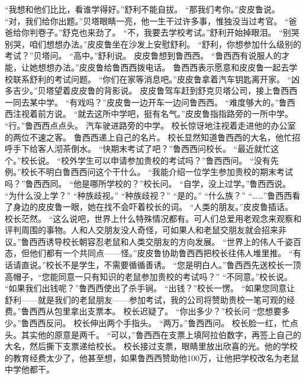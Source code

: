 \documentclass[a4paper,12pt,UTF8,twoside]{ctexbook}
\begin{document}
        “我想和他们比比，看谁学得好。”舒利不能自拔。 
        “那我们考你。”皮皮鲁说。 
        “对，我们给你出题。”贝塔眼睛一亮，他一生干过许多事，惟独没当过考官。 
        “爸爸给你判卷子。”舒克也来劲了。 
        “不，我要去学校考试。”舒利开始掉眼泪。 
        “别哭别哭，咱们想想办法。”皮皮鲁坐在沙发上安慰舒利。 
        “舒利，你想参加什么级别的考试？”贝塔问。 
        “高中。”舒利说。 
        皮皮鲁想到鲁西西。 
        “鲁西西有说服人的才能，让她想想办法。”皮皮鲁给鲁西西拨电话。 
        鲁西西表示愿意和皮皮鲁一起去学校联系舒利的考试问题。 
        “你们在家等消息吧。”皮皮鲁拿着汽车钥匙离开家。 
        “凶多吉少。”贝塔望着皮皮鲁的背影说。 
        皮皮鲁驾车赶到舒克贝塔公司，接上鲁西西一同去某中学。 
        “有戏吗？”皮皮鲁一边开车一边问鲁西西。 
        “难度够大的。”鲁西西注视着前方说。 
        “就去这所中学吧，挺有名气。”皮皮鲁指指路旁的一所中学。 
        “行。”鲁西西点点头。 
        汽车驶进路旁的中学。 
        校长惊讶地注视着走进他的办公室的两位不速之客。 
        鲁西西递上自己的名片。 
        校长显然知道鲁西西的大名，他忙招呼手下给客人沏茶倒水。 
        “快期末考试了吧？”鲁西西问校长。 
        “最近就忙这个。”校长说。 
        “校外学生可以申请参加贵校的考试吗？”鲁西西问。 
        “没有先例。”校长不明白鲁西西问这个干什么。 
        “我能介绍一位学生参加贵校的期末考试吗？”鲁西西同。 
        “他是哪所学校的？”校长问。 
        “自学，没上过学。”鲁西西说。 
        “为什么没上学？” 
        “种族歧视。” 
        “种族歧视？” 
        “是的。” 
        “什么族？” 
        “……”鲁西西看了身边的皮皮鲁一眼，她在找不会吓着校长的词。 
        “人类的朋友。”皮皮鲁插话。 
        校长茫然。 
        “这么说吧，世界上什么特殊情况都有。可人们总爱用老观念来观察和评判周围的事物。人和人交朋友没人奇怪，可如果人和老鼠交朋友就会招来非议。”鲁西西诱导校长朝容忍老鼠和人类交朋友的方向发展。 
        “世界上的伟人千姿百态，但他们都有一个共同点——怪。”皮皮鲁协助鲁西西把校长往伟人堆里推。 
        “有话请直说。”校长不是学生，不需要循循善诱。 
        “您是明白人。”鲁西西先送校长一顶高帽子，“您能同意一只有知识的老鼠参加贵校的考试吗？” 
        “不同意。”校长说。 
        “如果我们出钱呢？”鲁西西使出了杀手锏。 
        “出钱？”校长一愣。 
        “如果您同意让舒利——就是我们的老鼠朋友——参加考试，我的公司将赞助贵校一笔可观的经费。”鲁西西从包里拿出支票本。 
        校长迟疑了。 
        “你出多少？”校长问 
        “您想要多少。”鲁西西反问。 
        校长伸出两个手指头。 
        “两万。”鲁西西问。 
        校长脸一红，忙点头。其实他的原意是两千。 
        “可以，”鲁西西在支票上填阿拉伯数字，再签上自己的大名，然后撕下支票递给校长。 
        校长接过支票，眼睛里放出欣喜的光。他的学校的教育经费太少了，他甚至想，如果鲁西西赞助他100万，让他把学校改名为老鼠中学他都干。 
\end{document}
